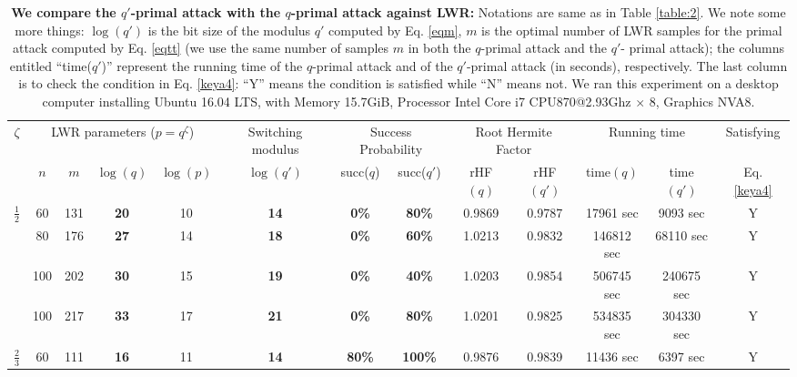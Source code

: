 \documentclass{cta-author}
\begin{document}
\begin{table}[t]
	\caption{\textbf{We compare the $q'$-primal attack with the $q$-primal attack against LWR:} Notations are same as in Table \ref{table:2}. We note some more things: $\log (q')$ is the bit size of the modulus $q'$ computed by Eq. \eqref{eqm}, $m$ is the optimal number of LWR samples for the primal attack computed by Eq. \eqref{eqtt} (we use the same number of samples $m$ in both the $q$-primal attack and the $q'$- primal attack); the columns entitled  ``time($q'$)'' represent the running time of  the $q$-primal attack and of the $q'$-primal attack (in seconds), respectively. The last column is to check the condition in Eq. \eqref{keya4}: ``Y'' means the condition is satisfied while ``N'' means not. We ran this experiment on a desktop computer installing Ubuntu 16.04 LTS, with Memory 15.7GiB, Processor Intel Core i7 CPU870@2.93Ghz $\times$ 8, Graphics NVA8.}
	\small\addtolength{\tabcolsep}{-2pt}
	\begin{tabular}{| c|| c| c | c | c | c || c | c |c|c| c|c|c| }
		
		\hline
		\hline
		\multirow{2}{*}{$\zeta$}&\multicolumn{4}{c|}{LWR parameters ($p=q^{\zeta}$)}&Switching modulus&\multicolumn{2}{c|}{Success Probability}&\multicolumn{2}{c|}{Root Hermite Factor}&\multicolumn{2}{c|}{Running time}&Satisfying\\
		&$n$& $m$& $\log (q)$ & $\log (p)$  & $\log (q')$  & succ($q$) & succ($q'$)&rHF$(q)$&rHF$(q')$&time$(q)$&time$(q')$&Eq. \eqref{keya4}\\
		\hline
		\hline
		
		\multirow{4}{*}{$\frac{1}{2}$}&60&131&\textbf{20}&10&\textbf{14}&\textbf{0\%}&\textbf{80\%}&0.9869&0.9787&17961 sec& 9093 sec &Y\\			
		&80&176&\textbf{27}&14&\textbf{18}&\textbf{0\%}&\textbf{60\% }&1.0213&0.9832&146812 sec&68110 sec&Y\\
		
		
		&100&202&\textbf{30}&15&\textbf{19}&\textbf{0\%}&\textbf{40\%}&1.0203&0.9854&506745 sec&240675 sec&Y\\
		&100&217&\textbf{33}&17&\textbf{21}&\textbf{0\%}&\textbf{80\%}&1.0201&0.9825&534835 sec&304330 sec&Y\\
		
		
		\hline
		
		\multirow{3}{*}{$\frac{2}{3}$}&60&111&\textbf{16}&11&\textbf{14}&\textbf{80\%}&\textbf{100\%}&0.9876&0.9839&11436 sec&6397 sec&Y\\
		

\end{tabular}
\end{table}
\end{document}
